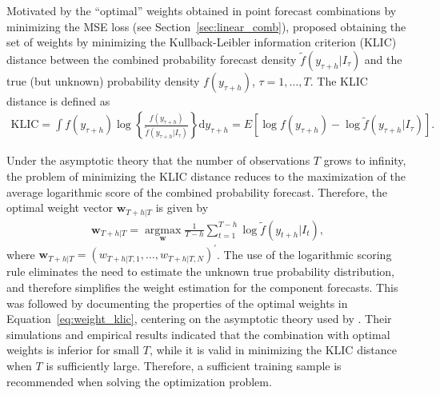 \documentclass[11pt]{article}
\begin{document}
Motivated by the ``optimal'' weights obtained in point forecast combinations by minimizing the MSE loss (see Section~\ref{sec:linear_comb}), \citet{Hall2007-lh} proposed obtaining the set of weights by minimizing the Kullback-Leibler information criterion (KLIC) distance between the combined probability forecast density $\tilde{f}(y_{\tau+h}|I_{\tau})$ and the true (but unknown) probability density $f(y_{\tau+h})$, $\tau=1,\dots,T$. The KLIC distance is defined as
\begin{align*}
  \mathrm{KLIC}  = \int f(y_{\tau+h}) \log \left\{\frac{f(y_{\tau+h})}{\tilde{f}(y_{\tau+h}|I_{\tau})}\right\} \mathrm{d} y_{\tau+h} 
                 =E\left[\log f(y_{\tau+h})-\log \tilde{f}(y_{\tau+h}|I_{\tau})\right].
\end{align*}

Under the asymptotic theory that the number of observations $T$ grows to infinity, the problem of minimizing the KLIC distance reduces to the maximization of the average logarithmic score of the combined probability forecast. Therefore, the optimal weight vector $\bm{w}_{T+h|T}$ is given by
\begin{align}
  \label{eq:weight_klic}
  \bm{w}_{T+h|T} = \underset{\bm{w}}{\operatorname{argmax}} \frac{1}{T-h} \sum_{t=1}^{T-h} \log \tilde{f}(y_{t+h}|I_{t}),
\end{align}
where $\bm{w}_{T+h|T}=\left(w_{T+h|T, 1}, \dots, w_{T+h|T, N}\right)^{\prime}$. The use of the logarithmic scoring rule eliminates the need to estimate the unknown true probability distribution, and therefore simplifies the weight estimation for the component forecasts. This was followed by \citet{Pauwels2016-ci} documenting the properties of the optimal weights in Equation~\eqref{eq:weight_klic}, centering on the asymptotic theory used by \citet{Hall2007-lh}. Their simulations and empirical results indicated that the combination with optimal weights is inferior for small $T$, while it is valid in minimizing the KLIC distance when $T$ is sufficiently large. Therefore, a sufficient training sample is recommended when solving the optimization problem.
\end{document}
